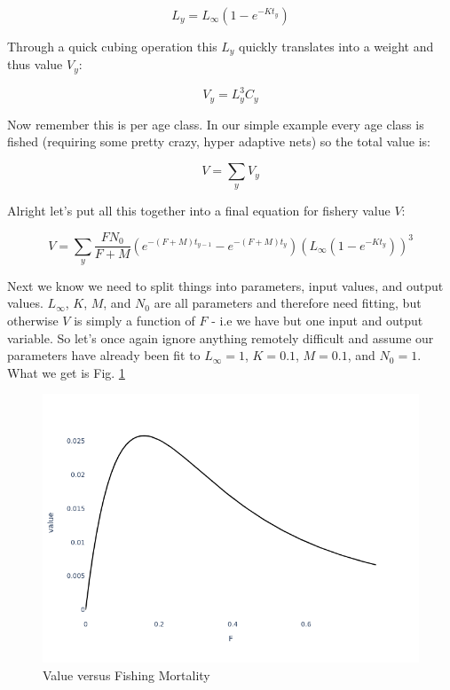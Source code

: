 \documentclass[11pt,a5paper]{book}
\begin{document}
$$L_y = L_{\infty}(1-e^{-Kt_y})$$

Through a quick cubing operation this $L_y$ quickly translates into a weight and thus value $V_y$:

$$V_y = L_y^3C_y$$

Now remember this is per age class. In our simple example every age class is fished (requiring some pretty crazy, hyper adaptive nets) so the total value is:

$$V = \sum_y V_y$$

Alright let's put all this together into a final equation for fishery value $V$:

$$V = \sum_y \frac{FN_0}{F+M}(e^{-(F+M)t_{y-1}}- e^{-(F+M)t_y})(L_{\infty}(1-e^{-Kt_y}))^3$$

Next we know we need to split things into parameters, input values, and output values. $L_\infty$, $K$, $M$, and $N_0$ are all parameters and therefore need fitting, but otherwise $V$ is simply a function of $F$ - i.e we have but one input and output variable. So let's once again ignore anything remotely difficult and assume our parameters have already been fit to $L_\infty=1$, $K=0.1$, $M=0.1$, and $N_0=1$. What we get is Fig. \ref{fig:value_v_F}
\newline

\begin{figure}[h!] 
  \includegraphics[width=\linewidth]{notebooks/SimpleOptimization/value_v_F.png}
  \caption{Value versus Fishing Mortality}
  \label{fig:value_v_F}
\end{figure}
\end{document}
